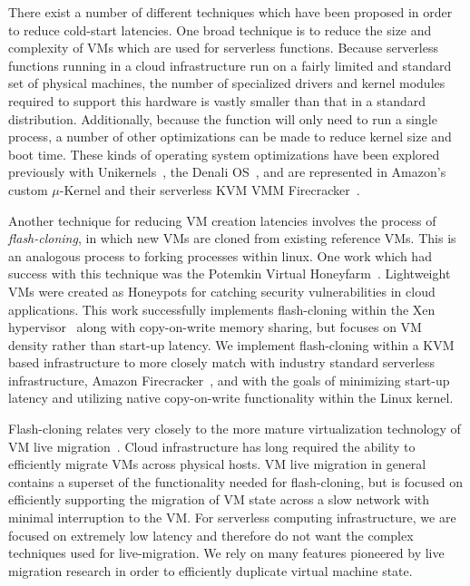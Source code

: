  There exist a number of different
techniques which have been proposed in order to reduce cold-start
latencies. One broad technique is to reduce the size and complexity of VMs
which are used for serverless functions. Because serverless functions running
in a cloud infrastructure run on a fairly limited and standard set of physical
machines, the number of specialized drivers and kernel modules required to
support this hardware is vastly smaller than that in a standard distribution.
Additionally, because the function will only need to run a single process, a
number of other optimizations can be made to reduce kernel size and boot time.
These kinds of operating system optimizations have been explored previously
with Unikernels~\cite{unikernels}, the Denali OS~\cite{denali}, and are
represented in Amazon's custom $\mu$-Kernel and their serverless KVM VMM
Firecracker~\cite{firecracker}.


Another technique for reducing VM creation latencies involves the process of
\emph{flash-cloning}, in which new VMs are cloned from existing reference VMs.
This is an analogous process to forking processes within linux. One work which
had success with this technique was the Potemkin Virtual
Honeyfarm~\cite{potemkin}. Lightweight VMs were created as Honeypots for
catching security vulnerabilities in cloud applications. This work successfully
implements flash-cloning within the Xen hypervisor~\cite{xen} along with
copy-on-write memory sharing, but focuses on VM density rather than start-up
latency. We implement flash-cloning within a KVM based infrastructure to more
closely match with industry standard serverless infrastructure, Amazon
Firecracker~\cite{firecracker}, and with the goals of minimizing start-up
latency and utilizing native copy-on-write functionality within the Linux
kernel.

 Flash-cloning relates very closely to the more
mature virtualization technology of VM live
migration~\cite{post-copy-migration}\cite{snowflock}. Cloud infrastructure has
long required the ability to efficiently migrate VMs across physical hosts. VM
live migration in general contains a superset of the functionality needed for
flash-cloning, but is focused on efficiently supporting the migration of VM
state across a slow network with minimal interruption to the VM. For serverless
computing infrastructure, we are focused on extremely low latency and therefore
do not want the complex techniques used for live-migration. We rely on many
features pioneered by live migration research in order to efficiently duplicate
virtual machine state.
